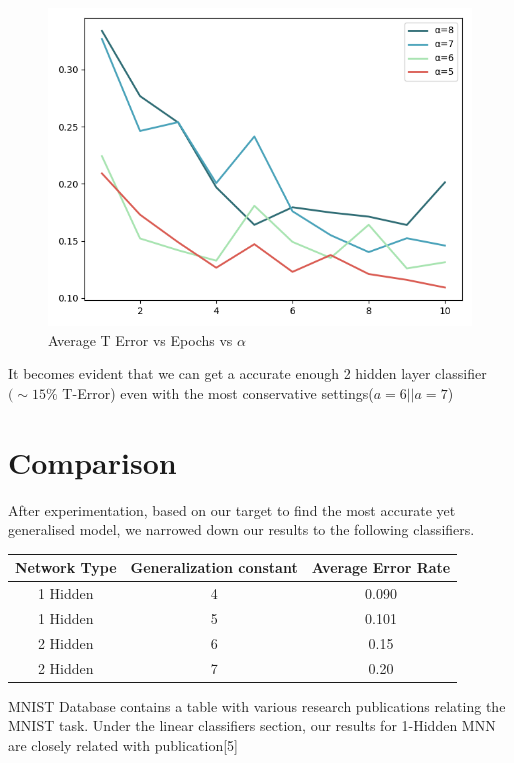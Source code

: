 \documentclass{proc}
\begin{document}
	\begin{figure}[!h]
		\includegraphics[width=\linewidth]{gentwo.png}
		\caption{Average T Error vs Epochs vs $\alpha$}
		\label{fig:1-X-1}
	\end{figure}
	
	It becomes evident that we can get a accurate enough 2 hidden layer classifier $(\sim 15\% $ T-Error) even with the most conservative settings(${a=6  || a=7}$)
	

	\section{Comparison}
	
	After experimentation, based on our target to find the most accurate yet generalised model, we narrowed down our results to the following classifiers.
	
	\begin{center}
		\begin{tabular}{ |c|c|c| }
			\hline
			Network Type&Generalization constant &Average Error Rate \\
			\hline
			1 Hidden &4  & 0.090 \\
			1 Hidden &5  & 0.101 \\
			2 Hidden &6  & 0.15 \\
			2 Hidden &7  & 0.20 \\
			\hline
		\end{tabular}
	\end{center}

	MNIST Database contains a table with various research publications relating the MNIST task. Under the linear classifiers section, our results for 1-Hidden MNN are closely related with publication[5]
	
\end{document}
